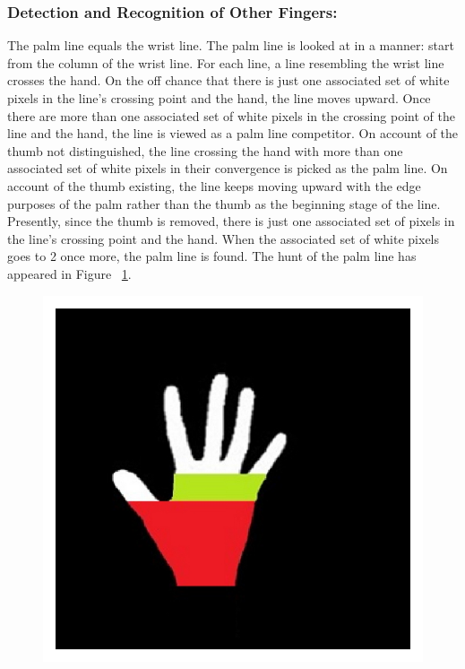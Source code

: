 \documentclass[a4paper]{article}
\begin{document}
\subsubsection{Detection and Recognition of Other Fingers:}
The palm line equals the wrist line. The palm line is looked at in a manner: start from the column of the wrist line. For each line, a line resembling the wrist line crosses the hand. On the off chance that there is just one associated set of white pixels in the line's crossing point and the hand, the line moves upward. Once there are more than one associated set of white pixels in the crossing point of the line and the hand, the line is viewed as a palm line competitor. On account of the thumb not distinguished, the line crossing the hand with more than one associated set of white pixels in their convergence is picked as the palm line. On account of the thumb existing, the line keeps moving upward with the edge purposes of the palm rather than the thumb as the beginning stage of the line. Presently, since the thumb is removed, there is just one associated set of pixels in the line's crossing point and the hand. When the associated set of white pixels goes to 2 once more, the palm line is found. The hunt of the palm line has appeared in Figure ~\ref{fig:The palm line.}.

\begin{figure}[h!]
\begin{center}
\includegraphics[scale=1.4]{Fig10}
\label{fig:The palm line.}
\end{center}
\end{figure}
\end{document}
